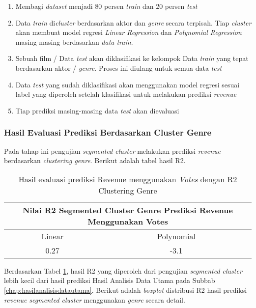 \begin{enumerate}
\item Membagi \textit{dataset} menjadi 80 persen \textit{train} dan 20 persen \textit{test} 

\item Data \textit{train} di\textit{cluster} berdasarkan aktor dan \textit{genre} secara terpisah. Tiap \textit{cluster} akan membuat model regresi  \textit{Linear Regression} dan \textit{Polynomial Regression} masing-masing berdasarkan \textit{data train}.
 
\item  Sebuah film / Data \textit{test} akan diklasifikasi ke kelompok Data \textit{train} yang tepat berdasarkan aktor / \textit{genre}. Proses ini diulang untuk semua data \textit{test}

\item Data \textit{test} yang sudah diklasifikasi akan menggunakan model regresi sesuai label yang diperoleh setelah klasifikasi untuk melakukan prediksi \textit{revenue}

\item Tiap prediksi masing-masing data \textit{test} akan dievaluasi
\end{enumerate}



\subsubsection{Hasil Evaluasi Prediksi Berdasarkan Cluster Genre} 
Pada tahap ini pengujian \textit{segmented cluster} melakukan prediksi \textit{revenue} berdasarkan \textit{clustering genre}. Berikut adalah tabel hasil R2.

\begin{table}[H]
\centering
\caption{Hasil evaluasi prediksi Revenue menggunakan \textit{Votes} dengan R2 Clustering Genre}
\begin{tabular}{|c|c|}
 \hline 
 \multicolumn{2}{|c|}{Nilai R2 Segmented Cluster Genre Prediksi Revenue Menggunakan Votes} \\ 
 \hline 
 Linear & Polynomial \\ 
 \hline 
 0.27 & -3.1 \\ 
 \hline 
 \end{tabular}  
\label{tab:r2_segmentedcluster_genre}
\end{table}


Berdasarkan Tabel \ref{tab:r2_segmentedcluster_genre}, hasil R2 yang diperoleh dari pengujian \textit{segmented cluster} lebih kecil dari hasil prediksi Hasil Analisis Data Utama pada Subbab \ref{chap:hasilanalisisdatautama}. Berikut adalah \textit{boxplot} distribusi R2 hasil prediksi \textit{revenue segmented cluster} menggunakan \textit{genre} secara detail.


